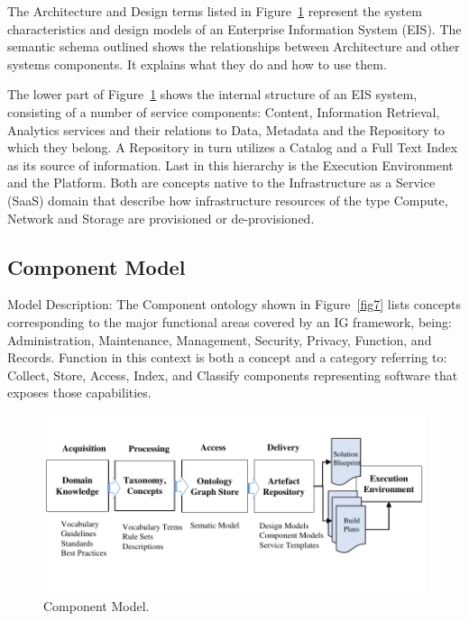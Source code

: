 \documentclass[runningheads]{llncs}
\begin{document}
The Architecture and Design terms listed in Figure~\ref{fig8} represent the system characteristics and design models of an Enterprise Information System (EIS). The semantic schema outlined shows the relationships between Architecture and other systems components. It explains what they do and how to use them. 


The lower part of Figure~\ref{fig8} shows the internal structure of an EIS system, consisting of a number of service components: Content, Information Retrieval, Analytics services and their relations to Data, Metadata and the Repository to which they belong. 
A Repository in turn utilizes a Catalog and a Full Text Index as its source of information. Last in this hierarchy is the Execution Environment and the Platform. Both are concepts native to the Infrastructure as a Service (SaaS) domain that describe how infrastructure resources of the type Compute, Network and Storage are provisioned or de-provisioned.
\subsection{Component Model}

Model Description: The Component ontology shown in Figure~\ref{fig7} lists concepts corresponding to the major functional areas covered by an IG framework, being: Administration, Maintenance, Management, Security, Privacy, Function, and Records. Function in this context is both a concept and a category referring to: Collect, Store, Access, Index, and Classify components representing software that exposes those capabilities. 

\begin{figure}[h] 
 \centering
\includegraphics[page=8,trim=0 1cm 0 1cm,clip, width=\textwidth]{figs/IGSModelsMedium.pdf}
\caption{Component Model.} \label{fig8}
\end{figure}
\end{document}
